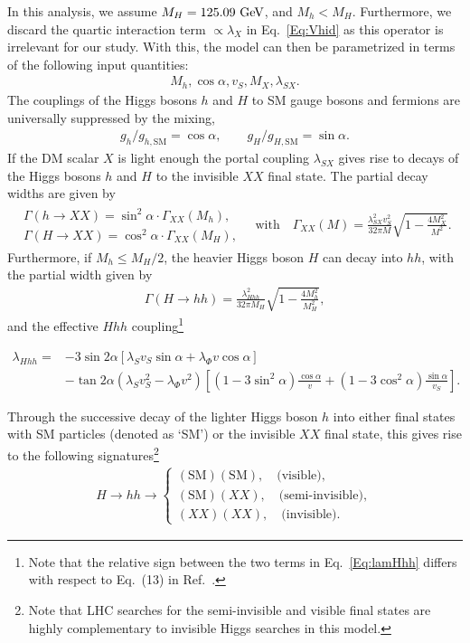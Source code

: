 \documentclass[../report.tex]{subfiles}
\begin{document}
In this analysis, we assume $M_H = 125.09~\text{GeV}$, and $M_h < M_H$. Furthermore, we discard the quartic interaction term $\propto \lambda_X$ in Eq.~\eqref{Eq:Vhid} as this operator is irrelevant for our study. With this, the model can then be parametrized in terms of the following input quantities:
\begin{align}
M_h, \cos\alpha, v_S, M_X, \lambda_{SX}.
\end{align}
The couplings of the Higgs bosons $h$ and $H$ to SM gauge bosons and fermions are universally suppressed by the mixing,
\begin{align}
g_h/g_{h,\mathrm{SM}} = \cos \alpha , \qquad g_H/g_{H,\mathrm{SM}} = \sin\alpha.
\end{align}
If the DM scalar $X$ is light enough the portal coupling $\lambda_{SX}$ gives rise to decays of the Higgs bosons $h$ and $H$ to the invisible $XX$ final state. The partial decay widths are given by
\begin{align}
\label{eq:invdecaywidth}
\begin{array}{l} \Gamma(h\to XX) = \sin^2\alpha \cdot \Gamma_{XX} (M_h), \\ \Gamma(H\to XX) = \cos^2\alpha \cdot \Gamma_{XX} (M_H), \end{array} \quad \mbox{with} \quad \Gamma_{XX}(M) = \frac{\lambda_{SX}^2 v_S^2 }{32\pi M} \sqrt{1 - \frac{4M_X^2}{M^2}}.
\end{align}
Furthermore, if $M_h \le M_H/2$, the heavier Higgs boson $H$ can decay into $hh$, with the partial width given by
\begin{align}
\Gamma(H\to hh) = \frac{\lambda_{Hhh}^2}{32\pi M_H} \sqrt{1 - \frac{4M_h^2}{M_H^2}},
\end{align}
and the effective $Hhh$ coupling\footnote{Note that the relative sign between the two terms in Eq.~\eqref{Eq:lamHhh} differs with respect to Eq.~(13) in Ref.~\cite{Englert:2011yb}.}

\begin{align}
\label{Eq:lamHhh}
\lambda_{Hhh} = & - 3\sin2\alpha \left[ \lambda_S v_S \sin\alpha  + \lambda_{\Phi} v \cos\alpha \right] \nonumber\\
& - \tan2\alpha \left( \lambda_S v_S^2 - \lambda_{\Phi} v^2 \right) \left[ (1-3\sin^2\alpha) \frac{\cos\alpha}{v} + (1-3 \cos^2\alpha) \frac{\sin\alpha}{v_S} \right].
\end{align}


Through the successive decay of the lighter Higgs boson $h$ into either final states with SM particles (denoted as `SM') or the invisible $XX$ final state, this gives rise to the following signatures\footnote{{Note that LHC searches for the semi-invisible and visible final states are highly complementary to invisible Higgs searches in this model.}}
\begin{align}
H \to hh \to \left\{ \begin{array}{l} (\mathrm{SM}) (\mathrm{SM}) ,\quad \mbox{(visible)}, \\ (\mathrm{SM}) (XX) ,\quad \mbox{(semi-invisible)}, \\
(XX) (XX) ,\quad \mbox{(invisible)}.
\end{array} \right.
\end{align}
\end{document}
